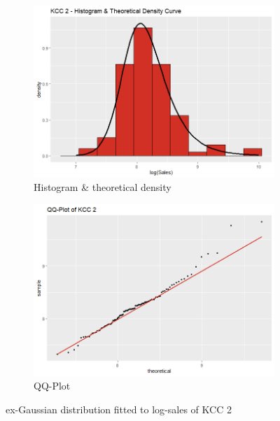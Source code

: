  \begin{figure}[H]
\centering
\begin{subfigure}{.45\textwidth}
  \centering
  \includegraphics[width=\linewidth]{figures/kcc_2_density.png}
  \caption{Histogram \& theoretical density}
  \label{fig:kcc_2_density}
\end{subfigure}
\begin{subfigure}{.45\textwidth}
  \centering
  \includegraphics[width=\linewidth]{figures/kcc_2_qqplot.png}
  \caption{QQ-Plot}
  \label{fig:kcc_2_qqplot}
\end{subfigure}
\caption{ex-Gaussian distribution fitted to log-sales of \ac{KCC} 2}
\label{fig:kcc_2_marginal}
\end{figure} 




